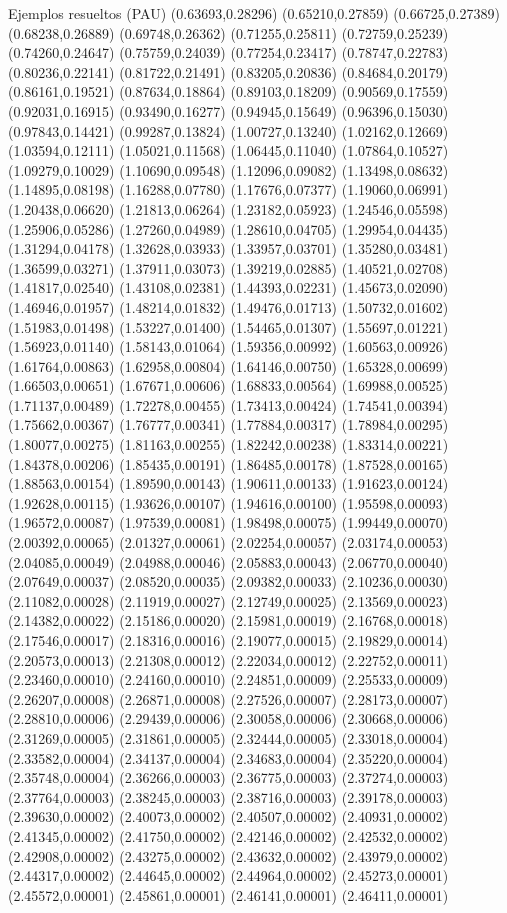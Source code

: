 \documentclass[11pt,a4paper]{article}
\begin{document}
\begin{fmex}{Ejemplos resueltos (PAU)}
(0.63693,0.28296) (0.65210,0.27859) (0.66725,0.27389) (0.68238,0.26889) (0.69748,0.26362) (0.71255,0.25811) (0.72759,0.25239) (0.74260,0.24647) (0.75759,0.24039) (0.77254,0.23417) (0.78747,0.22783) (0.80236,0.22141) (0.81722,0.21491) (0.83205,0.20836) (0.84684,0.20179) (0.86161,0.19521) (0.87634,0.18864) (0.89103,0.18209) (0.90569,0.17559) (0.92031,0.16915) (0.93490,0.16277) (0.94945,0.15649) (0.96396,0.15030) (0.97843,0.14421) (0.99287,0.13824) (1.00727,0.13240) (1.02162,0.12669) (1.03594,0.12111) (1.05021,0.11568) (1.06445,0.11040) (1.07864,0.10527) (1.09279,0.10029) (1.10690,0.09548) (1.12096,0.09082) (1.13498,0.08632) (1.14895,0.08198) (1.16288,0.07780) (1.17676,0.07377) (1.19060,0.06991) (1.20438,0.06620) (1.21813,0.06264) (1.23182,0.05923) (1.24546,0.05598) (1.25906,0.05286) (1.27260,0.04989) (1.28610,0.04705) (1.29954,0.04435) (1.31294,0.04178) (1.32628,0.03933) (1.33957,0.03701) (1.35280,0.03481) (1.36599,0.03271) (1.37911,0.03073) (1.39219,0.02885) (1.40521,0.02708) (1.41817,0.02540) (1.43108,0.02381) (1.44393,0.02231) (1.45673,0.02090) (1.46946,0.01957) (1.48214,0.01832) (1.49476,0.01713) (1.50732,0.01602) (1.51983,0.01498) (1.53227,0.01400) (1.54465,0.01307) (1.55697,0.01221) (1.56923,0.01140) (1.58143,0.01064) (1.59356,0.00992) (1.60563,0.00926) (1.61764,0.00863) (1.62958,0.00804) (1.64146,0.00750) (1.65328,0.00699) (1.66503,0.00651) (1.67671,0.00606) (1.68833,0.00564) (1.69988,0.00525) (1.71137,0.00489) (1.72278,0.00455) (1.73413,0.00424) (1.74541,0.00394) (1.75662,0.00367) (1.76777,0.00341) (1.77884,0.00317) (1.78984,0.00295) (1.80077,0.00275) (1.81163,0.00255) (1.82242,0.00238) (1.83314,0.00221) (1.84378,0.00206) (1.85435,0.00191) (1.86485,0.00178) (1.87528,0.00165) (1.88563,0.00154) (1.89590,0.00143) (1.90611,0.00133) (1.91623,0.00124) (1.92628,0.00115) (1.93626,0.00107) (1.94616,0.00100) (1.95598,0.00093) (1.96572,0.00087) (1.97539,0.00081) (1.98498,0.00075) (1.99449,0.00070) (2.00392,0.00065) (2.01327,0.00061) (2.02254,0.00057) (2.03174,0.00053) (2.04085,0.00049) (2.04988,0.00046) (2.05883,0.00043) (2.06770,0.00040) (2.07649,0.00037) (2.08520,0.00035) (2.09382,0.00033) (2.10236,0.00030) (2.11082,0.00028) (2.11919,0.00027) (2.12749,0.00025) (2.13569,0.00023) (2.14382,0.00022) (2.15186,0.00020) (2.15981,0.00019) (2.16768,0.00018) (2.17546,0.00017) (2.18316,0.00016) (2.19077,0.00015) (2.19829,0.00014) (2.20573,0.00013) (2.21308,0.00012) (2.22034,0.00012) (2.22752,0.00011) (2.23460,0.00010) (2.24160,0.00010) (2.24851,0.00009) (2.25533,0.00009) (2.26207,0.00008) (2.26871,0.00008) (2.27526,0.00007) (2.28173,0.00007) (2.28810,0.00006) (2.29439,0.00006) (2.30058,0.00006) (2.30668,0.00006) (2.31269,0.00005) (2.31861,0.00005) (2.32444,0.00005) (2.33018,0.00004) (2.33582,0.00004) (2.34137,0.00004) (2.34683,0.00004) (2.35220,0.00004) (2.35748,0.00004) (2.36266,0.00003) (2.36775,0.00003) (2.37274,0.00003) (2.37764,0.00003) (2.38245,0.00003) (2.38716,0.00003) (2.39178,0.00003) (2.39630,0.00002) (2.40073,0.00002) (2.40507,0.00002) (2.40931,0.00002) (2.41345,0.00002) (2.41750,0.00002) (2.42146,0.00002) (2.42532,0.00002) (2.42908,0.00002) (2.43275,0.00002) (2.43632,0.00002) (2.43979,0.00002) (2.44317,0.00002) (2.44645,0.00002) (2.44964,0.00002) (2.45273,0.00001) (2.45572,0.00001) (2.45861,0.00001) (2.46141,0.00001) (2.46411,0.00001) 
\end{fmex}
\end{document}

